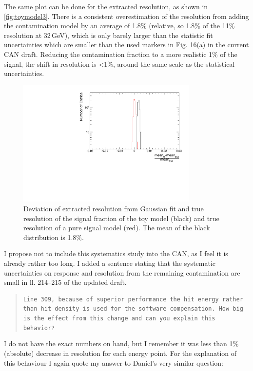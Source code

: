 \documentclass[twoside,a4paper,12pt]{article}
\begin{document}
The same plot can be done for the extracted resolution, as shown in \autoref{fig:toymodel3}. There is a consistent overestimation of the resolution from adding the contamination model by an average of 1.8\% (relative, so 1.8\% of the 11\% resolution at 32\,GeV), which is only barely larger than the statistic fit uncertainties which are smaller than the used markers in Fig. 16(a) in the current CAN draft. Reducing the contamination fraction to a more realistic 1\% of the signal, the shift in resolution is \textless 1\%, around the same scale as the statistical uncertainties.
\begin{figure}[htbp]
\begin{center}
\includegraphics[width=0.8\textwidth,page=3]{ToyModelFit}
\caption{Deviation of extracted resolution from Gaussian fit and true resolution of the signal fraction of the toy model (black) and true resolution of a pure signal model (red). The mean of the black distribution is 1.8\%.}
\label{fig:toymodel3}
\end{center}
\end{figure} 

I propose not to include this systematics study into the CAN, as I feel it is already rather too long. I added a sentence stating that the systematic uncertainties on response and resolution from the remaining contamination are small in ll. 214--215 of the updated draft.
\clearpage
\begin{quote}\texttt{Line 309, because of superior performance the hit energy rather than hit density is used for the software compensation.  How big is the effect from this change and can you explain this behavior?}\end{quote}
I do not have the exact numbers on hand, but I remember it was less than 1\% (absolute) decrease in resolution for each energy point. For the explanation of this behaviour I again quote my answer to Daniel's very similar question:
\end{document}
